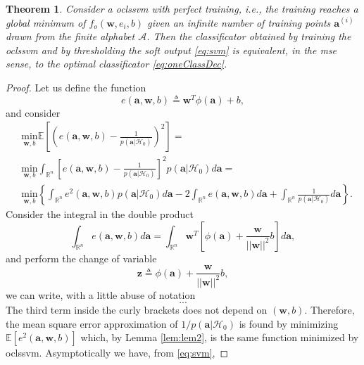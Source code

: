 \documentclass[draftcls,onecolumn,12pt]{IEEEtran}
\newcommand{\ie}{i.e., }
\newcommand{\Exp}[1]{\mathbb{E}\left[#1\right]}
\newtheorem{theorem}{Theorem}
\begin{document}
\begin{theorem}
	\label{th:onelsnp}
	Consider a \ac{oclssvm} with perfect training, \ie the training reaches a global minimum of $f_o(\mathbf{w},e_i,b)$ given an infinite number of training points $\bm{a}^{(i)}$ drawn from the finite alphabet $\mathcal A$. Then the classificator obtained by training the \ac{oclssvm} and by thresholding the soft output \eqref{eq:svm} is equivalent, in the \ac{mse} sense, to the optimal classificator \eqref{eq:oneClassDec}.
\end{theorem}

\begin{proof}
Let us define the function 
\begin{equation}
	e(\mathbf{a},\mathbf{w},b) \triangleq \mathbf{w}^T  \phi (\mathbf{a}) + b,	
\end{equation}
and consider 
\begin{equation}
	\begin{aligned}
		&\underset{\mathbf{w},b}{\text{min}} \Exp{ \left( e(\mathbf{a},\mathbf{w},b) - \frac{1}{p(\mathbf{a}|\mathcal{H}_0)}\right) ^2} = \\
		&\underset{\mathbf{w},b}{\text{min}} \int_{\mathbb{R}^n} \left[ e(\mathbf{a},\mathbf{w},b) - \frac{1}{p(\mathbf{a}|\mathcal{H}_0)} \right] ^2 p(\mathbf{a}|\mathcal{H}_0) d\mathbf{a} = \\
		&\underset{\mathbf{w},b}{\text{min}} \left\lbrace \int_{\mathbb{R}^n} e^2(\mathbf{a},\mathbf{w},b) p(\mathbf{a}|\mathcal{H}_0) d\mathbf{a}
		-2\int_{\mathbb{R}^n} e(\mathbf{a},\mathbf{w},b) d\mathbf{a}
		+ \int_{\mathbb{R}^n} \frac{1}{p(\mathbf{a}|\mathcal{H}_0)} d\mathbf{a} \right\rbrace.
	\end{aligned}	
\end{equation}
Consider the integral in the double product
\begin{equation}
		\int_{\mathbb{R}^n} e(\mathbf{a},\mathbf{w},b) d\mathbf{a} =
		\int_{\mathbb{R}^n} \mathbf{w} ^T \left[ \phi (\mathbf{a}) + \frac{\mathbf{w}}{||\mathbf{w}||^2} b  \right] d\mathbf{a},		
\end{equation}
and perform the change of variable
\begin{equation}
	\mathbf{z} \triangleq \phi (\mathbf{a}) + \frac{\mathbf{w}}{||\mathbf{w}||^2} b, 	
\end{equation}
we can write, with a little abuse of notation
\begin{equation}
	...	
\end{equation}
The third term inside the curly brackets does not depend on $(\mathbf{w},b)$. Therefore, the mean square error approximation of $1/p(\mathbf{a}|\mathcal{H}_0)$ is found by minimizing $\Exp{e^2(\mathbf{a},\mathbf{w},b)}$ which, by Lemma \ref{lem:lem2}, is the same function minimized by \ac{oclssvm}. Asymptotically we have, from \eqref{eq:svm},

\end{proof}
\end{document}
